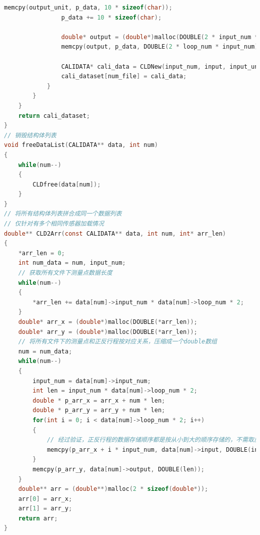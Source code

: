 \documentclass[a4paper,12pt,twoside]{article}%
\begin{document}
\begin{lstlisting}[language=C]
				memcpy(output_unit, p_data, 10 * sizeof(char));
				p_data += 10 * sizeof(char);
				
				double* output = (double*)malloc(DOUBLE(2 * input_num * loop_num));
				memcpy(output, p_data, DOUBLE(2 * loop_num * input_num));
				
				CALIDATA* cali_data = CLDNew(input_num, input, input_unit, loop_num, output_unit, output);
				cali_dataset[num_file] = cali_data;
			}
		}
	}
	return cali_dataset;
}
// 销毁结构体列表
void freeDataList(CALIDATA** data, int num)
{
	while(num--)
	{
		CLDfree(data[num]);
	}
}
// 将所有结构体列表拼合成同一个数据列表
// 仅针对有多个相同传感器加载情况
double** CLD2Arr(const CALIDATA** data, int num, int* arr_len)
{
	*arr_len = 0;
	int num_data = num, input_num;
	// 获取所有文件下测量点数据长度
	while(num--)
	{
		*arr_len += data[num]->input_num * data[num]->loop_num * 2;
	}
	double* arr_x = (double*)malloc(DOUBLE(*arr_len));
	double* arr_y = (double*)malloc(DOUBLE(*arr_len));
	// 将所有文件下的测量点和正反行程按对应关系，压缩成一个double数组
	num = num_data;
	while(num--)
	{	
		input_num = data[num]->input_num;
		int len = input_num * data[num]->loop_num * 2;
		double * p_arr_x = arr_x + num * len;
		double * p_arr_y = arr_y + num * len;
		for(int i = 0; i < data[num]->loop_num * 2; i++)
		{	
			// 经过验证，正反行程的数据存储顺序都是按从小到大的顺序存储的，不需取反顺序
			memcpy(p_arr_x + i * input_num, data[num]->input, DOUBLE(input_num));
		}
		memcpy(p_arr_y, data[num]->output, DOUBLE(len));
	}
	double** arr = (double**)malloc(2 * sizeof(double*));
	arr[0] = arr_x;
	arr[1] = arr_y;
	return arr;
}
\end{lstlisting}
\end{document}

